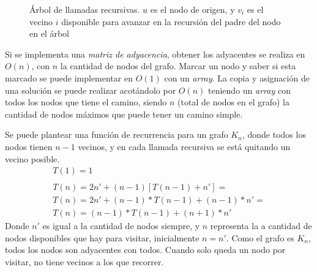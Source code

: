 \begin{figure}[htbp]
\centering
{}

\caption{\'Arbol de llamadas recursivas. $u$ es el nodo de origen, y $v_i$ es el vecino $i$ disponible para avanzar en la recursi\'on del padre del nodo en el \'arbol}
\label{exacto:arbol_llamadas}
\end{figure}

Si se implementa una \emph{matriz de adyacencia}, obtener los adyacentes se realiza en $O(n)$, con $n$ la cantidad de nodos del grafo.
Marcar un nodo y saber si esta marcado se puede implementar en $O(1)$ con un \emph{array}.
La copia y asignaci\'on de una soluci\'on se puede realizar acot\'andolo por $O(n)$ teniendo un \emph{array} con todos los nodos que tiene el camino, siendo $n$ (total de nodos en el grafo) la cantidad de nodos m\'aximos que puede tener un camino simple.

Se puede plantear una funci\'on de recurrencia para un grafo $K_n$, donde todos los nodos tienen $n - 1$ vecinos, y en cada llamada recursiva se est\'a quitando un vecino posible.
\begin{equation*}
\begin{split}
T(1) = 1 \\
\\
T(n) = 2n' + (n-1)[T(n-1) + n'] = \\
T(n) = 2n' + (n-1)*T(n-1) + (n-1)*n' = \\
T(n) = (n-1)*T(n-1) + (n+1)*n'
\end{split}
\end{equation*}
Donde $n'$ es igual a la cantidad de nodos siempre, y $n$ representa la a cantidad de nodos disponibles que hay para visitar, inicialmente $n = n'$. Como el grafo es $K_n$, todos los nodos son adyacentes con todos. Cuando solo queda un nodo por visitar, no tiene vecinos a los que recorrer.

